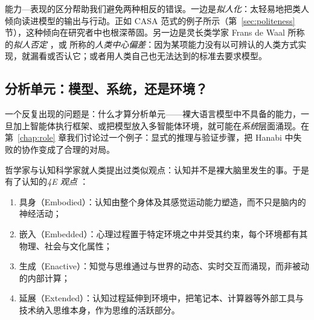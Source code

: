 能力—表现的区分帮助我们避免两种相反的错误。一边是\emph{拟人化}：太轻易地把类人倾向读进模型的输出与行动。正如 CASA 范式的例子所示（第~\ref{sec:politeness} 节），这种倾向在研究者中也根深蒂固。另一边是灵长类学家 Frans de Waal 所称的\emph{拟人否定} \citep{deWaal1999anthropo}，或 \citet{milliere2026anth} 所称的\emph{人类中心偏差}：因为某项能力没有以可辨认的人类方式实现，就漏看或否认它；或者用人类自己也无法达到的标准去要求模型。

\subsection{分析单元：模型、系统，还是环境？} \label{sec:unit}
一个反复出现的问题是：什么才算分析单元——裸大语言模型中不具备的能力，一旦加上智能体执行框架、或把模型放入多智能体环境，就可能在\emph{系统}层面涌现。在第~\ref{chap:role} 章我们讨论过一个例子：显式的推理与验证步骤，把 Hanabi 中失败的协作变成了合理的对局。

哲学家与认知科学家就人类提出过类似观点：认知并不是裸大脑里发生的事。于是有了认知的\emph{4E 观点} \citep{noe2009outofourheads, Carney2020foure}：
\begin{enumerate}
    \item 具身（Embodied）：认知由整个身体及其感觉运动能力塑造，而不只是脑内的神经活动；
    \item 嵌入（Embedded）：心理过程置于特定环境之中并受其约束，每个环境都有其物理、社会与文化属性；
    \item 生成（Enactive）：知觉与思维通过与世界的动态、实时交互而涌现，而非被动的内部计算；
    \item 延展（Extended）：认知过程延伸到环境中，把笔记本、计算器等外部工具与技术纳入思维本身，作为思维的活跃部分。
\end{enumerate}

